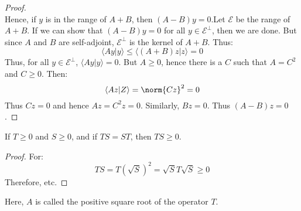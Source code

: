 \begin{proof}
\begin{equation}
        \end{equation}
        Hence, if $y$ is in the range of $A+B$, then
        $(A-B)y=0$.Let $\mathcal{E}$ be the range of $A+B$.
        If we can show that $(A-B)y=0$ for all
        $y\in\mathcal{E}^{\perp}$, then we are done. But since
        $A$ and $B$ are self-adjoint, $\mathcal{E}^{\perp}$
        is the kernel of $A+B$. Thus:
        \begin{equation}
            \langle{Ay|y}\rangle\leq
            \langle{(A+B)z|z}\rangle=0
        \end{equation}
        Thus, for all $y\in\mathcal{E}^{\perp}$,
        $\langle{Ay|y}\rangle=0$. But $A\geq{0}$, hence there
        is a $C$ such that $A=C^{2}$ and $C\geq{0}$.
        Then:
        \begin{equation}
            \langle{Az|Z}\rangle=\norm{Cz}^{2}=0
        \end{equation}
        Thus $Cz=0$ and hence $Az=C^{2}z=0$. Similarly,
        $Bz=0$. Thus $(A-B)z=0$.
    \end{proof}
    \begin{theorem}
        If $T\geq{0}$ and $S\geq{0}$, and if
        $TS=ST$, then $TS\geq{0}$.
    \end{theorem}
    \begin{proof}
        For:
        \begin{equation}
            TS=T(\sqrt{S})^{2}=\sqrt{S}T\sqrt{S}\geq{0}
        \end{equation}
        Therefore, etc.
    \end{proof}
    Here, $A$ is called the positive square root of the
    operator $T$.
